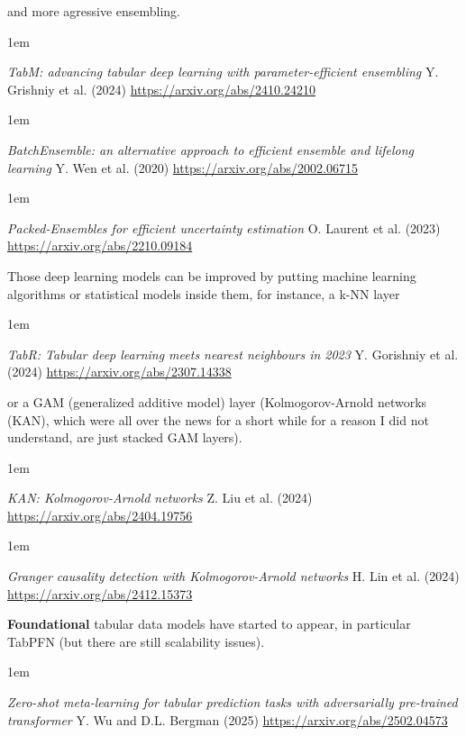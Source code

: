 \documentclass[a5paper]{article}
\let\d\textbf
\newenvironment{reference}{%
  \medskip\goodbreak
  \parskip 0pt
  \raggedright
  \leftskip 1em
  \obeylines
}{\par\medskip\goodbreak}
\begin{document}
and more agressive ensembling.

\begin{reference}
  \emph{TabM: advancing tabular deep learning  with parameter-efficient ensembling}
  Y. Grishniy et al. (2024)
  \url{https://arxiv.org/abs/2410.24210}
\end{reference}

\begin{reference}
  \emph{BatchEnsemble: an alternative approach  to efficient ensemble and lifelong learning}
  Y. Wen et al. (2020)
  \url{https://arxiv.org/abs/2002.06715}
\end{reference}

\begin{reference}
  \emph{Packed-Ensembles  for efficient uncertainty estimation}
  O. Laurent et al. (2023)
  \url{https://arxiv.org/abs/2210.09184}
\end{reference}

Those deep learning models can be improved by putting machine learning algorithms
or statistical models inside them,
for instance, a k-NN layer

\begin{reference}
  \emph{TabR: Tabular deep learning  meets nearest neighbours in 2023}
  Y. Gorishniy et al. (2024)
  \url{https://arxiv.org/abs/2307.14338}
\end{reference}

or a GAM (generalized additive model) layer
(Kolmogorov-Arnold networks (KAN),
which were all over the news for a short while for a reason I did not understand,
are just stacked GAM layers).

\begin{reference}
  \emph{KAN: Kolmogorov-Arnold networks}
  Z. Liu et al. (2024)
  \url{https://arxiv.org/abs/2404.19756}
\end{reference}

\begin{reference}
  \emph{Granger causality detection with Kolmogorov-Arnold networks}
  H. Lin et al. (2024)
  \url{https://arxiv.org/abs/2412.15373}
\end{reference}

\d{Foundational} tabular data models have started to appear, in particular TabPFN
(but there are still scalability issues).

\begin{reference}
  \emph{Zero-shot meta-learning  for tabular prediction tasks  with adversarially pre-trained transformer}
  Y. Wu and D.L. Bergman (2025)
  \url{https://arxiv.org/abs/2502.04573}
\end{reference}
\end{document}
